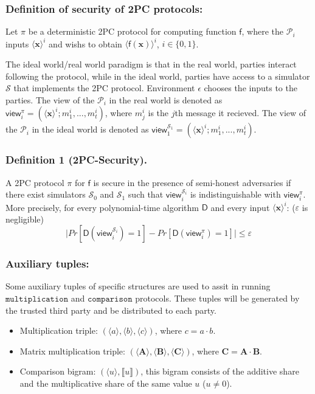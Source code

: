 \documentclass[letterpaper]{article} %
\begin{document}
    \subsubsection{Definition of security of 2PC protocols:}
    Let $\pi $ be a deterministic 2PC protocol for computing
    function $\mathsf{f}$,
    where the $\mathcal{P}_{i}$ inputs $\langle \mathbf{x}\rangle ^{i}$
    and wishs to obtain $\langle \mathsf{f}(\mathbf{x}) \rangle ^{i}$, $i \in \{0,1\}$.

    The ideal world/real world paradigm \cite{SecurityProof} is that
    in the real world, parties interact following the protocol,
    while in the ideal world, parties have access to a
    simulator $\mathcal{S}$ that implements the 2PC protocol.
    Environment $\epsilon $ chooses the
    inputs to the parties.
    The view of the $\mathcal{P}_{i}$ in the real world
    is denoted as $\mathsf{view}_{i}^{\pi}=(\langle \mathbf{x}\rangle ^{i};m^{i}_{1},...,m^{i}_{t})$,
    where $m^{i}_{j}$ is the $j$th message it recieved. The view of the $\mathcal{P}_{i}$ in the ideal world
    is denoted as $\mathsf{view}_{1}^{\mathcal{S}_{1}}=(\langle \mathbf{x}\rangle ^{i};m^{i}_{1},...,m^{i}_{t})$.

    \subsubsection{Definition 1 (2PC-Security).}
    A 2PC protocol $\pi$ for $\mathsf{f}$ is secure in the presence of semi-honest adversaries
    if there exist simulators $\mathcal{S}_{0}$ and $\mathcal{S}_{1}$ such that
    $\mathsf{view}_{i}^{\mathcal{S}_{i}}$ is indistinguishable with $\mathsf{view}_{i}^{\pi}$.
    More precisely,
    for every polynomial-time algorithm $\mathsf{D}$ and every input $\langle \mathbf{x}\rangle ^{i}$: ($\varepsilon $ is negligible)
        $$\lvert Pr[\mathsf{D}(\mathsf{view}_{i}^{\mathcal{S}_{i}})=1]-Pr[\mathsf{D}(\mathsf{view}_{i}^{\pi})=1]\rvert \leq \varepsilon   $$


    \subsubsection{Auxiliary tuples:}
    Some auxiliary tuples of specific structures are used to
    assit in running $\mathtt{multiplication}$ and $\mathtt{comparison}$ protocols.
    These tuples will be generated by the trusted third party and be distributed to each party.
    \begin{itemize}
        \item Multiplication triple: $(\langle a\rangle,\langle b\rangle,\langle c\rangle)$, where $c=a\cdot b$.
        \item Matrix multiplication triple: $(\langle \mathbf{A}\rangle,\langle \mathbf{B}\rangle,\langle \mathbf{C}\rangle)$, where $\mathbf{C}=\mathbf{A}\cdot \mathbf{B}$.
        \item Comparison bigram: $(\langle u\rangle,\llbracket u \rrbracket)$,
        this bigram consists of the additive share and the multiplicative share of the same value $u$ ($u\neq 0 $).
    \end{itemize}
\end{document}
